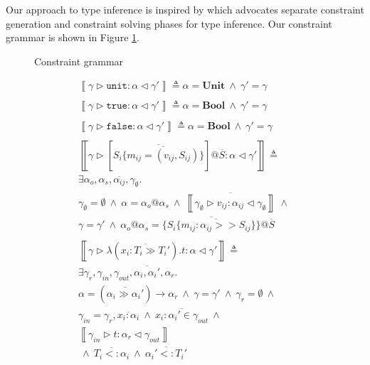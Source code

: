 \documentclass[preprint]{sigplanconf}
\newcommand{\figref}[1]{Figure \ref{#1}}
\newcommand{\inferrule}[4]{\left\llbracket #1 \triangleright #2 : #3 \triangleleft #4 \right\rrbracket}
\newcommand{\inferlhs}[1]{\left\llbracket \gamma \triangleright #1 : \alpha \triangleleft \gamma' \right\rrbracket}
\newcommand{\unitv}{\mathtt{unit}}
\newcommand{\unitt}{\mathbf{Unit}}
\newcommand{\truev}{\mathtt{true}}
\newcommand{\falsev}{\mathtt{false}}
\newcommand{\boolt}{\mathbf{Bool}}
\newcommand{\cand}{\:\wedge\:}
\begin{document}
Our approach to type inference is inspired by \cite{Pottier2005} which advocates
separate constraint generation and constraint solving phases for
type inference. Our constraint grammar is shown in \figref{fig:congrammar}.

\begin{figure}
\ottgrammartabular{
\ottC\ottinterrule
\ottctxc\ottinterrule
\otttyc\ottinterrule
\otttinf\ottinterrule
\ottoinf\ottinterrule
\ottsinf\ottinterrule
}
\caption{\label{fig:congrammar} Constraint grammar}
\end{figure}

\begin{figure}
\[
\begin{array}{ll}

\inferlhs{\unitv} \triangleq \alpha = \unitt \cand \gamma' = \gamma
\\\\

\inferlhs{\truev} \triangleq \alpha = \boolt \cand \gamma' = \gamma 
\\\\

\inferlhs{\falsev} \triangleq \alpha = \boolt \cand \gamma' = \gamma 
\\\\

\inferlhs{[ \overline{S_i \{ \overline{ m_{ij} = (v_{ij}, S_{ij}) } \} }]@\overline{S}}
\triangleq \\
\exists \alpha_o, \alpha_s, \overline{\alpha_{ij}}, \gamma_{\emptyset} . \\
\gamma_{\emptyset} = \emptyset
\cand
\alpha = \alpha_o@\alpha_s
\cand
\overline{\inferrule{\gamma_{\emptyset}}{v_{ij}}{\alpha_{ij}}{\gamma_{\emptyset}}}
\cand
\\
\gamma = \gamma'
\cand
\alpha_o @ \alpha_s = \{ \overline{ S_i \{ \overline{ m_{ij} : \alpha_{ij} >> S_{ij} } \} }\} @ \overline{S}
\\\\

\inferlhs{\lambda ( \overline{x_i : T_i \gg T_i'} ) . t} \triangleq \\
\exists \gamma_r, \gamma_{in}, \gamma_{out}, \overline{\alpha_i, \alpha_i'}, \alpha_r . \\
\alpha = (\overline{\alpha_i \gg \alpha_i'}) \rightarrow \alpha_r
\cand
\gamma = \gamma'
\cand
\gamma_r = \emptyset
\cand \\
\gamma_{in} = \gamma_r, \overline{x_i : \alpha_i}
\cand
\overline{x_i : \alpha_i' \in \gamma_{out}}
\cand
\\
\inferrule{\gamma_{in}}{t}{\alpha_r}{\gamma_{out}}
\\
\cand
\overline{T_i <: \alpha_i}
\cand
\overline{\alpha_i' <: T_i'}
\\\\


\end{array}\]
\end{figure}
\end{document}

